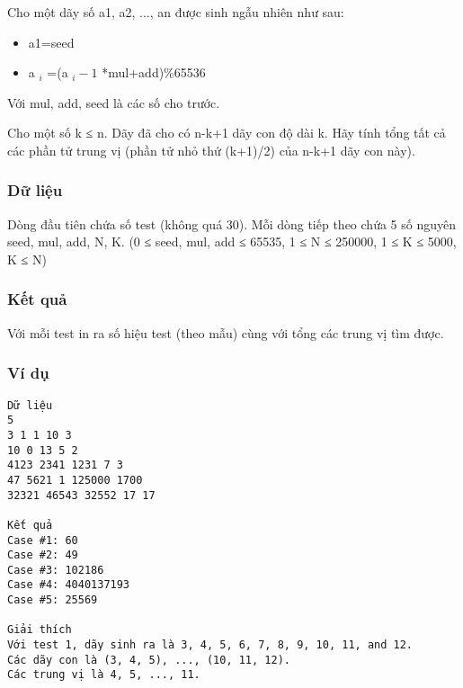 



   Cho một dãy số a1, a2, ..., an được sinh ngẫu nhiên như sau:  
\begin{itemize}
	\item     a1=seed   
	\item     a    $_     i    $    =(a    $_     i-1    $    *mul+add)\%65536   
\end{itemize}

   Với mul, add, seed là các số cho trước.  

   Cho một số k ≤ n. Dãy đã cho có n-k+1 dãy con độ dài k. Hãy tính tổng tất cả các phần tử trung vị (phần tử nhỏ thứ (k+1)/2) của n-k+1 dãy con này).  

\subsubsection{   Dữ liệu  }

   Dòng đầu tiên chứa số test (không quá 30). Mỗi dòng tiếp theo chứa 5 số nguyên seed, mul, add, N, K. (0 ≤ seed, mul, add ≤ 65535, 1 ≤ N ≤ 250000, 1 ≤ K ≤ 5000, K ≤ N)  

\subsubsection{   Kết quả  }

   Với mỗi test in ra số hiệu test (theo mẫu) cùng với tổng các trung vị tìm được.  

\subsubsection{   Ví dụ  }
\begin{verbatim}
Dữ liệu
5
3 1 1 10 3
10 0 13 5 2
4123 2341 1231 7 3
47 5621 1 125000 1700
32321 46543 32552 17 17

Kết quả
Case #1: 60
Case #2: 49
Case #3: 102186
Case #4: 4040137193
Case #5: 25569

Giải thích
Với test 1, dãy sinh ra là 3, 4, 5, 6, 7, 8, 9, 10, 11, and 12.
Các dãy con là (3, 4, 5), ..., (10, 11, 12).
Các trung vị là 4, 5, ..., 11.
\end{verbatim}